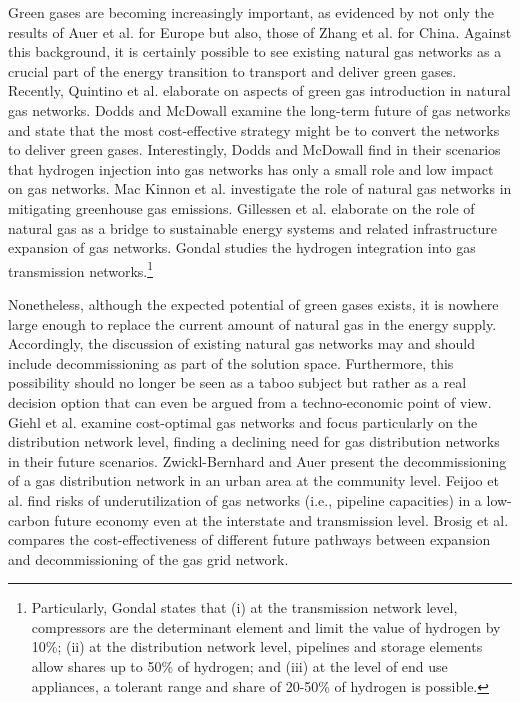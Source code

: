 Green gases are becoming increasingly important, as evidenced by not only the results of Auer et al. for Europe but also, those of Zhang et al. \cite{zhang2022potential} for China. Against this background, it is certainly possible to see existing natural gas networks as a crucial part of the energy transition to transport and deliver green gases. Recently, Quintino et al. \cite{quintino2021aspects} elaborate on aspects of green gas introduction in natural gas networks. Dodds and McDowall \cite{dodds2013future} examine the long-term future of gas networks and state that the most cost-effective strategy might be to convert the networks to deliver green gases. Interestingly, Dodds and McDowall find in their scenarios that hydrogen injection into gas networks has only a small role and low impact on gas networks.   Mac Kinnon et al. \cite{mac2018role} investigate the role of natural gas networks in mitigating greenhouse gas emissions. Gillessen et al. \cite{gillessen2019natural} elaborate on the role of natural gas as a bridge to sustainable energy systems and related infrastructure expansion of gas networks. Gondal \cite{gondal2019hydrogen} studies the hydrogen integration into gas transmission networks.\footnote{Particularly, Gondal states that (i) at the transmission network level, compressors are the determinant element and limit the value of hydrogen by 10\%; (ii) at the distribution network level, pipelines and storage elements allow shares up to 50\% of hydrogen; and (iii) at the level of end use appliances, a tolerant range and share of 20-50\% of hydrogen is possible.}\vspace{0.35cm}

Nonetheless, although the expected potential of green gases exists, it is nowhere large enough to replace the current amount of natural gas in the energy supply. Accordingly, the discussion of existing natural gas networks may and should include decommissioning as part of the solution space. Furthermore, this possibility should no longer be seen as a taboo subject but rather as a real decision option that can even be argued from a techno-economic point of view. Giehl et al. \cite{giehl2021modelling} examine cost-optimal gas networks and focus particularly on the distribution network level, finding a declining need for gas distribution networks in their future scenarios. Zwickl-Bernhard and Auer \cite{zwickl2022demystifying} present the decommissioning of a gas distribution network in an urban area at the community level. Feijoo et al. \cite{feijoo2018future} find risks of underutilization of gas networks (i.e., pipeline capacities) in a low-carbon future economy even at the interstate and transmission level. Brosig et al. \cite{brosig2017benchmark} compares the cost-effectiveness of different future pathways between expansion and decommissioning of the gas grid network.\vspace{0.3cm}

